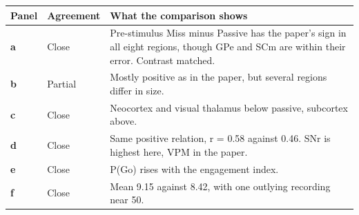 \begin{longtable}{@{}p{1.1cm}p{2.5cm}p{11.8cm}@{}}
\toprule
Panel & Agreement & What the comparison shows \\
\midrule
\endhead
\textbf{a} & Close & Pre-stimulus Miss minus Passive has the paper's sign in all eight regions, though GPe and SCm are within their error. Contrast matched. \\
\textbf{b} & Partial & Mostly positive as in the paper, but several regions differ in size. \\
\textbf{c} & Close & Neocortex and visual thalamus below passive, subcortex above. \\
\textbf{d} & Close & Same positive relation, r = 0.58 against 0.46. SNr is highest here, VPM in the paper. \\
\textbf{e} & Close & P(Go) rises with the engagement index. \\
\textbf{f} & Close & Mean 9.15 against 8.42, with one outlying recording near 50. \\
\bottomrule
\end{longtable}
